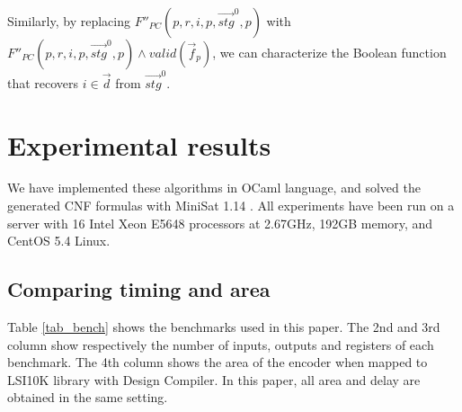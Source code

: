 \documentclass[conference]{IEEEtran}
\begin{document}
Similarly,
by replacing $F''_{PC}(p,r,i,p,\vec{stg}^0,p)$ with $F''_{PC}(p,r,i,p,\vec{stg}^0,p)\wedge valid(\vec{f}_p)$,
we can characterize the Boolean function that recovers $i\in\vec{d}$ from $\vec{stg}^0$.



\section{Experimental results}\label{sec_exp}
We have implemented these algorithms in OCaml language,
and solved the generated CNF formulas with MiniSat 1.14 \cite{EXTSAT}.
All experiments have been run on a server with 16 Intel Xeon E5648 processors at 2.67GHz, 
192GB memory, and CentOS 5.4 Linux.


\subsection{Comparing timing and area}
Table \ref{tab_bench} shows the benchmarks used in this paper.
The 2nd and 3rd column show respectively the number of inputs, outputs and registers of each benchmark.
The 4th column shows the area of the encoder when mapped to LSI10K library with Design Compiler.
In this paper, 
all area and delay are obtained in the same setting.
\end{document}
